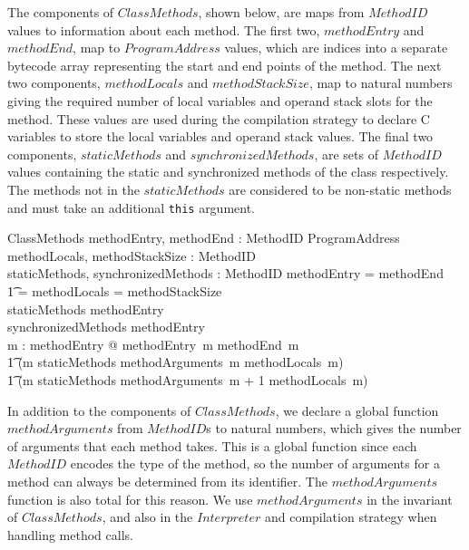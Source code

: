 The components of $ClassMethods$, shown below, are maps from
$MethodID$ values to information about each method.
The first two, $methodEntry$ and $methodEnd$, map to $ProgramAddress$
values, which are indices into a separate bytecode array representing
the start and end points of the method.
The next two components, $methodLocals$ and $methodStackSize$, map to
natural numbers giving the required number of local variables and
operand stack slots for the method.
These values are used during the compilation strategy to declare C
variables to store the local variables and operand stack values.
The final two components, $staticMethods$ and $synchronizedMethods$,
are sets of $MethodID$ values containing the static and synchronized
methods of the class respectively.
The methods not in the $staticMethods$ are considered to be non-static
methods and must take an additional \texttt{this} argument.
\begin{schema}{ClassMethods}
  methodEntry, methodEnd : MethodID \pfun ProgramAddress \\
  methodLocals, methodStackSize : MethodID \pfun \nat \\
  staticMethods, synchronizedMethods : \finset MethodID
\where
  \dom methodEntry = \dom methodEnd \\
  \t1 {} = \dom methodLocals = \dom methodStackSize \\
  staticMethods \subseteq \dom methodEntry \\
  synchronizedMethods \subseteq \dom methodEntry \\
  \forall m : \dom methodEntry @ methodEntry~m \leq methodEnd~m \\
  \t1 \land (m \in staticMethods \implies methodArguments~m \leq methodLocals~m) \\
  \t1 \land (m \notin staticMethods \implies methodArguments~m + 1 \leq methodLocals~m)
\end{schema}
In addition to the components of $ClassMethods$, we declare a global
function $methodArguments$ from $MethodID$s to natural numbers, which
gives the number of arguments that each method takes.
This is a global function since each $MethodID$ encodes the type of
the method, so the number of arguments for a method can always be
determined from its identifier.
The $methodArguments$ function is also total for this reason.
We use $methodArguments$ in the invariant of $ClassMethods$, and also
in the $Interpreter$ and compilation strategy when handling method
calls.

